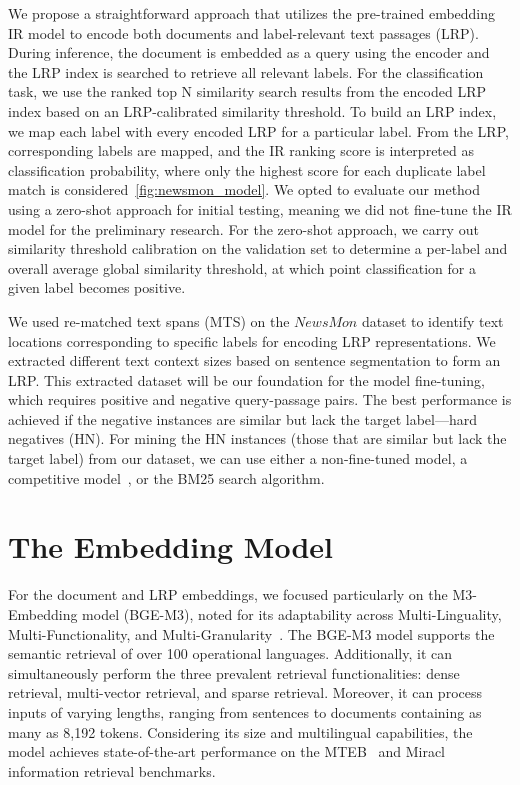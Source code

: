 We propose a straightforward approach that utilizes the pre-trained embedding IR model to encode both documents and label-relevant text passages (LRP).
During inference, the document is embedded as a query using the encoder and the LRP index is searched to retrieve all relevant labels.
For the classification task, we use the ranked top N similarity search results from the encoded LRP index based on an LRP-calibrated similarity threshold. 
To build an LRP index, we map each label with every encoded LRP for a particular label.
From the LRP, corresponding labels are mapped, and the IR ranking score is interpreted as classification probability, where only the highest score for each duplicate label match is considered~\ref{fig:newsmon_model}.
We opted to evaluate our method using a zero-shot approach for initial testing, meaning we did not fine-tune the IR model for the preliminary research.
For the zero-shot approach, we carry out similarity threshold calibration on the validation set to determine a per-label and overall average global similarity threshold, at which point classification for a given label becomes positive. 

We used re-matched text spans (MTS) on the $NewsMon$ dataset to identify text locations corresponding to specific labels for encoding LRP representations. 
We extracted different text context sizes based on sentence segmentation to form an LRP.
This extracted dataset will be our foundation for the model fine-tuning, which requires positive and negative query-passage pairs.
The best performance is achieved if the negative instances are similar but lack the target label—hard negatives (HN).
For mining the HN instances (those that are similar but lack the target label) from our dataset, we can use either a non-fine-tuned model, a competitive model~\parencite{wang2024multilinguale5textembeddings, xiao2024cpackpackagedresourcesadvance}, or the BM25 search algorithm.

\section{The Embedding Model}
For the document and LRP embeddings, we focused particularly on the M3-Embedding model (BGE-M3), noted for its adaptability across Multi-Linguality, Multi-Functionality, and Multi-Granularity~\parencite{chen2024bgem3embeddingmultilingualmultifunctionality}. 
The BGE-M3 model supports the semantic retrieval of over 100 operational languages. 
Additionally, it can simultaneously perform the three prevalent retrieval functionalities: dense retrieval, multi-vector retrieval, and sparse retrieval. 
Moreover, it can process inputs of varying lengths, ranging from sentences to documents containing as many as 8,192 tokens.
Considering its size and multilingual capabilities, the model achieves state-of-the-art performance on the MTEB~\parencite{muennighoff2022mteb} and Miracl~\parencite{zhang2023miracl} information retrieval benchmarks.

